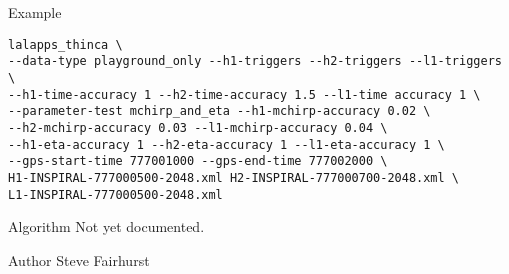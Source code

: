 \begin{entry}
\item[Example]
\begin{verbatim}
lalapps_thinca \
--data-type playground_only --h1-triggers --h2-triggers --l1-triggers \
--h1-time-accuracy 1 --h2-time-accuracy 1.5 --l1-time accuracy 1 \
--parameter-test mchirp_and_eta --h1-mchirp-accuracy 0.02 \
--h2-mchirp-accuracy 0.03 --l1-mchirp-accuracy 0.04 \ 
--h1-eta-accuracy 1 --h2-eta-accuracy 1 --l1-eta-accuracy 1 \
--gps-start-time 777001000 --gps-end-time 777002000 \
H1-INSPIRAL-777000500-2048.xml H2-INSPIRAL-777000700-2048.xml \
L1-INSPIRAL-777000500-2048.xml
\end{verbatim}

\item[Algorithm]
Not yet documented.


\item[Author] 
Steve Fairhurst
\end{entry}


